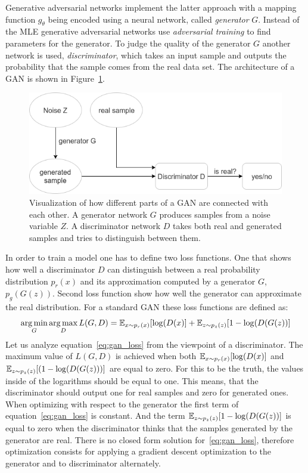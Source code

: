 \indent Generative adversarial networks implement the latter approach with a mapping function $g_\theta$ being encoded using a neural network, called \textit{generator} $G$. Instead of the MLE generative adversarial networks use \textit{adversarial training} to find parameters for the generator. To judge the quality of the generator $G$ another network is used, \textit{discriminator}, which takes an input sample and outputs the probability that the sample comes from the real data set. The architecture of a GAN is shown in Figure~\ref{fig:gan}.\\

\begin{figure}[h]
	\includegraphics[width=\textwidth]{figures/gan}
	\caption{Visualization of how different parts of a GAN are connected with each other. A generator network $G$ produces samples from a noise variable $Z$. A discriminator network $D$ takes both real and generated samples and tries to distinguish between them.}
	\label{fig:gan}
\end{figure}

\indent In order to train a model one has to define two loss functions. One that shows how well a discriminator $D$ can distinguish between a real probability distribution $p_r(x)$ and its approximation computed by a generator $G$, $p_g(G(z))$. Second loss function show how well the generator can approximate the real distribution. For a standard GAN these loss functions are defined as: 
\begin{equation} \label{eq:gan_loss}
\operatorname*{arg\,min}_G \operatorname*{arg\,max}_D L(G,D) = \operatorname{\mathbb{E}}_{x \sim p_r(x)} [\log(D(x)] + \operatorname{\mathbb{E}}_{z \sim p_z(z)}[1-\log(D(G(z))]
\end{equation}
Let us analyze equation~\ref{eq:gan_loss} from the viewpoint of a discriminator. The maximum value of $L(G,D)$ is achieved when both $\operatorname{\mathbb{E}}_{x \sim p_r(x)} [\log(D(x)]$ and $\operatorname{\mathbb{E}}_{z \sim p_z(z)}[(1-\log(D(G(z)))]$ are equal to zero. For this to be the truth, the values inside of the  logarithms should be equal to one. This means, that the discriminator should output one for real samples and zero for generated ones. When optimizing with respect to the generator the first term of equation~\ref{eq:gan_loss} is constant. And the term $\operatorname{\mathbb{E}}_{z \sim p_z(z)}[1-\log(D(G(z))]$ is equal to zero when the discriminator thinks that the samples generated by the generator are real. There is no closed form solution for~\ref{eq:gan_loss}, therefore optimization consists for applying a gradient descent optimization to the generator and to discriminator alternately.\\  

